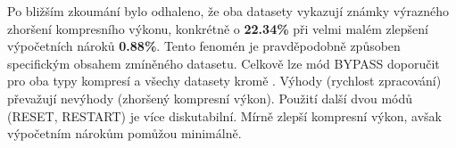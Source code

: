 \noindent Po bližším zkoumání bylo odhaleno, že oba datasety  vykazují známky výrazného zhoršení kompresního výkonu, konkrétně o \textbf{22.34\%} při velmi malém zlepšení výpočetních nároků \textbf{0.88\%}. Tento fenomén je pravděpodobně způsoben specifickým obsahem zmíněného datasetu. Celkově lze mód BYPASS doporučit pro oba typy kompresí a všechy datasety kromě . Výhody (rychlost zpracování) převažují nevýhody (zhoršený kompresní výkon). Použití další dvou módů (RESET, RESTART) je více diskutabilní. Mírně zlepší kompresní výkon, avšak výpočetním nárokům pomůžou minimálně. 
%
%
\newpage

